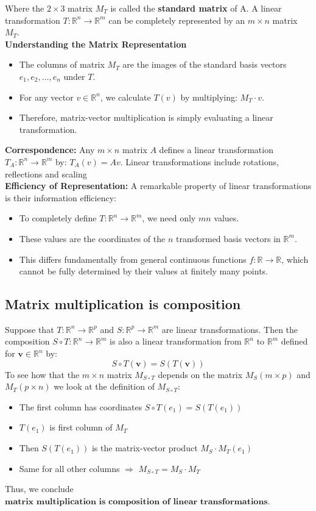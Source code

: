 \documentclass[a4paper, 9pt]{extarticle}
\begin{document}
Where the $2\times 3$ matrix $M_T$ is called the \textbf{standard matrix} of A.
A linear transformation $T: \mathbb{R}^n \rightarrow \mathbb{R}^m$ can be completely represented by an $m \times n$ matrix $M_T$. \\[2ex]
\textbf{Understanding the Matrix Representation}
\begin{itemize}
  \item The columns of matrix $M_T$ are the images of the standard basis vectors $e_1, e_2, \ldots, e_n$ under $T$.
  \item For any vector $v \in \mathbb{R}^n$, we calculate $T(v)$ by multiplying: $M_T \cdot v$.
  \item Therefore, matrix-vector multiplication is simply evaluating a linear transformation.
\end{itemize}
\textbf{Correspondence:} Any $m \times n$ matrix $A$ defines a linear transformation $T_A: \mathbb{R}^n \rightarrow \mathbb{R}^m$ by: $T_A(v) = Av$. Linear transformations include rotations, reflections and scaling \\[2ex]
\textbf{Efficiency of Representation:} A remarkable property of linear transformations is their information efficiency:
\begin{itemize}
  \item To completely define $T: \mathbb{R}^n \rightarrow \mathbb{R}^m$, we need only $mn$ values.
  \item These values are the coordinates of the $n$ transformed basis vectors in $\mathbb{R}^m$.
  \item This differs fundamentally from general continuous functions $f: \mathbb{R} \rightarrow \mathbb{R}$, which cannot be fully determined by their values at finitely many points.
\end{itemize}
\pagebreak
\subsection*{Matrix multiplication is composition}
Suppose that $T:\mathbb{R}^n \to \mathbb{R}^p$ and $S:\mathbb{R}^p \to \mathbb{R}^m$ are linear transformations. Then the composition $S \circ T: \mathbb{R}^n \to \mathbb{R}^m$ is also a linear transformation from $\mathbb{R}^n$ to $\mathbb{R}^m$ defined for $\mathbf{v} \in \mathbb{R}^n$ by:
$$
  S \circ T(\mathbf{v}) = S(T(\mathbf{v}))
$$
To see how that the $m \times n$ matrix $M_{S\circ T}$ depends on the matrix $M_S (m \times p)$ and $M_T (p \times n)$ we look at the definition of $M_{S\circ T}$:
\begin{itemize}
  \item The first column has coordinates $S\circ T(e_1) = S(T(e_1))$
  \item $T(e_1)$ is first column of $M_T$
  \item Then $S(T(e_1))$ is the matrix-vector product $M_S \cdot M_T(e_1)$
  \item Same for all other columns $\Longrightarrow$ $M_{S\circ T} = M_S \cdot M_T$
\end{itemize}
Thus, we conclude $\textbf{matrix multiplication is composition of linear transformations}$.
\pagebreak
\end{document}

